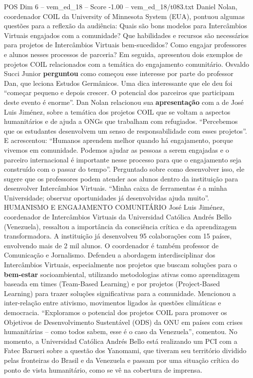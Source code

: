 \begin{textsample}{POS Dim 6 – vem\_ed\_18 – Score -1.00 – vem\_ed\_18/t083.txt}  \label{ex:f6_pos_080}
Daniel Nolan, coordenador COIL da University of Minnesota System (EUA), pontuou algumas questões para a reflexão da audiência: Quais são bons modelos para Intercâmbios Virtuais engajados com a comunidade?
Que habilidades e recursos são necessários para projetos de Intercâmbios Virtuais bem-sucedidos?
Como engajar professores e alunos nesses processos de parceria?
Em seguida, apresentou dois exemplos de projetos COIL relacionados com a temática do engajamento comunitário.
Osvaldo Succi Junior \textbf{perguntou} como começou esse interesse por parte do professor Dan, que leciona Estudos Germânicos.
Uma dica interessante que ele deu foi “começar pequeno e depois crescer.
O potencial dos parceiros que participam deste evento é enorme”.
Dan Nolan relacionou sua \textbf{apresentação} com a de José Luis Jiménez, sobre a temática dos projetos COIL que se voltam a aspectos humanitários e de ajuda a ONGs que trabalham com refugiados. “Percebemos que os estudantes desenvolvem um senso de responsabilidade com esses projetos”.
E acrescentou: “Humanos aprendem melhor quando há engajamento, porque vivemos em comunidade.
Podemos ajudar as pessoas a serem engajadas e o parceiro internacional é importante nesse processo para que o engajamento seja construído com o passar do tempo”.
Perguntado sobre como desenvolver isso, ele sugere que os professores podem atender aos alunos dentro da instituição para desenvolver Intercâmbios Virtuais. “Minha caixa de ferramentas é a minha Universidade; observar oportunidades já desenvolvidas ajuda muito”.
HUMANISMO E ENGAJAMENTO COMUNITÁRIO José Luis Jiménez, coordenador de Intercâmbios Virtuais da Universidad Católica Andrés Bello (Venezuela), ressaltou a importância da consciência crítica e da aprendizagem transformadora.
A instituição já desenvolveu 95 colaborações com 15 países, envolvendo mais de 2 mil alunos.
O coordenador é também professor de Comunicação e Jornalismo.
Defendeu a abordagem interdisciplinar dos Intercâmbios Virtuais, especialmente nos projetos que buscam soluções para o \textbf{bem-estar} socioambiental, utilizando metodologias ativas como aprendizagem baseada em times (Team-Based Learning) e por projetos (Project-Based Learning) para trazer soluções significativas para a comunidade.
Mencionou a inter-relação entre ativismo, movimentos ligados às questões climáticas e democracia. “Exploramos o potencial dos projetos COIL para promover os Objetivos de Desenvolvimento Sustentável (ODS) da ONU em países com crises humanitárias – como todos sabem, esse é o caso da Venezuela”, comentou.
No momento, a Universidad Católica Andrés Bello está realizando um PCI com a Fatec Barueri sobre a questão dos Yanomami, que tiveram seu território dividido pelas fronteiras do Brasil e da Venezuela e passam por uma situação crítica do ponto de vista humanitário, como se vê na cobertura de imprensa.

\end{textsample}
